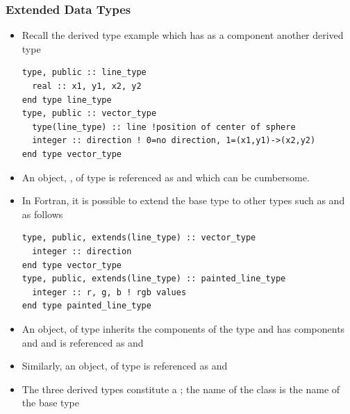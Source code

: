 \documentclass[10pt,t]{beamer}
\begin{document}
\begin{frame}
  \frametitle{\small Extended Data Types}
  \begin{itemize}
    \item Recall the derived type example which has as a component another derived type
      \begin{lstlisting}[language={[90]Fortran}]
type, public :: line_type 
  real :: x1, y1, x2, y2
end type line_type 
type, public :: vector_type
  type(line_type) :: line !position of center of sphere
  integer :: direction ! 0=no direction, 1=(x1,y1)->(x2,y2) 
end type vector_type
      \end{lstlisting}
    \item An object, , of type  is referenced as  and  which can be cumbersome.
      \framebreak
    \item In Fortran, it is possible to extend the base type  to other types such as  and  as follows
      \begin{lstlisting}[language={[90]Fortran}]
type, public, extends(line_type) :: vector_type 
  integer :: direction
end type vector_type 
type, public, extends(line_type) :: painted_line_type
  integer :: r, g, b ! rgb values 
end type painted_line_type
      \end{lstlisting}
    \item An object, of type  inherits the components of the type  and has components  and  and is referenced as  and  
    \item Similarly, an object,  of type  is referenced as  and 
    \item The three derived types constitute a ; the name of the class is the name of the base type 
  \end{itemize}
\end{frame}
\end{document}
